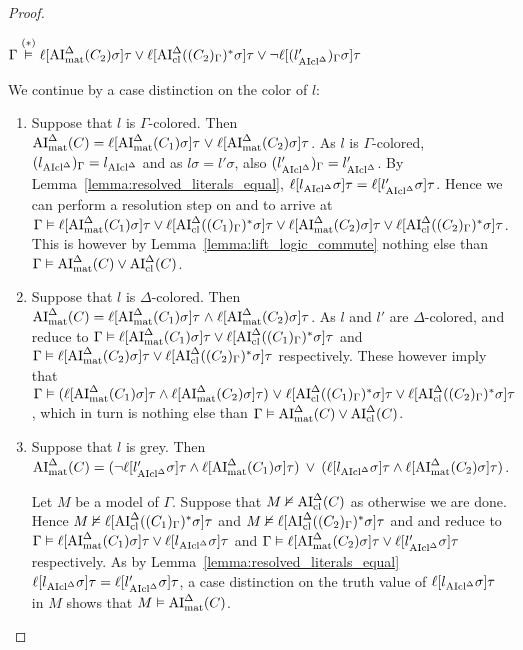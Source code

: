 \documentclass[,%
	draft=false,%
	numbers=noendperiod
	11pt,
	a4paper,
	oneside,%
	openany,
]{memoir}
\begin{document}
\begin{proof}
\begin{description}
			$\Gamma \stackrel{(*)}{\vDash} \ell[\operatorname{AI}_\mathrm{mat}^\Delta(C_2)\sigma]\tau \lor \ell[\operatorname{AI}_\mathrm{cl}^\Delta((C_2)_\Gamma)^*\sigma]\tau \lor \lnot \ell[(l{_{\operatorname{AIcl}^\Delta}'})_\Gamma\sigma]\tau$

			We continue by a case distinction on the color of $l$:
			\begin{enumerate}
				\item Suppose that $l$ is $\Gamma$-colored. Then $\operatorname{AI}_\mathrm{mat}^\Delta(C) = \ell[\operatorname{AI}_\mathrm{mat}^\Delta(C_1)\sigma]\tau\;{\lor}\; \ell[\operatorname{AI}_\mathrm{mat}^\Delta(C_2)\sigma]\tau$.
					As $l$ is $\Gamma$-colored, $(l{_{\operatorname{AIcl}^\Delta}})_\Gamma = l_{\operatorname{AIcl}^\Delta}$ and
					as $l\sigma = l'\sigma$, also $(l{_{\operatorname{AIcl}^\Delta}'})_\Gamma = l'_{\operatorname{AIcl}^\Delta}$.
					By Lemma~\ref{lemma:resolved_literals_equal}, $\ell[l{_{\operatorname{AIcl}^\Delta}}\sigma]\tau = \ell[l{_{\operatorname{AIcl}^\Delta}'}\sigma]\tau$.
					Hence we can perform a resolution step on \markA{} and \markB{} to arrive at
					$\Gamma \vDash \ell[\operatorname{AI}_\mathrm{mat}^\Delta(C_1)\sigma]\tau \lor \ell[\operatorname{AI}_\mathrm{cl}^\Delta((C_1)_\Gamma)^*\sigma]\tau
					\lor \ell[\operatorname{AI}_\mathrm{mat}^\Delta(C_2)\sigma]\tau \lor \ell[\operatorname{AI}_\mathrm{cl}^\Delta((C_2)_\Gamma)^*\sigma]\tau$.
					This is however by Lemma~\ref{lemma:lift_logic_commute} nothing else than $\Gamma \vDash \operatorname{AI}_\mathrm{mat}^\Delta(C) \lor \operatorname{AI}_\mathrm{cl}^\Delta(C)$.

				\item Suppose that $l$ is $\Delta$-colored. Then $\operatorname{AI}_\mathrm{mat}^\Delta(C) = \ell[\operatorname{AI}_\mathrm{mat}^\Delta(C_1)\sigma]\tau\;{\land}\; \ell[\operatorname{AI}_\mathrm{mat}^\Delta(C_2)\sigma]\tau$.
					As $l$ and $l'$ are $\Delta$-colored, \markA{} and \markB{} reduce to
					$\Gamma \vDash \ell[\operatorname{AI}_\mathrm{mat}^\Delta(C_1)\sigma]\tau \lor \ell[\operatorname{AI}_\mathrm{cl}^\Delta((C_1)_\Gamma)^*\sigma]\tau $ and
					$\Gamma \vDash \ell[\operatorname{AI}_\mathrm{mat}^\Delta(C_2)\sigma]\tau \lor \ell[\operatorname{AI}_\mathrm{cl}^\Delta((C_2)_\Gamma)^*\sigma]\tau $ respectively.
					These however imply that
					$\Gamma \vDash (\ell[\operatorname{AI}_\mathrm{mat}^\Delta(C_1)\sigma]\tau \land  \ell[\operatorname{AI}_\mathrm{mat}^\Delta(C_2)\sigma]\tau) \;{\lor}\;\allowbreak \ell[\operatorname{AI}_\mathrm{cl}^\Delta((C_1)_\Gamma)^*\sigma]\tau \lor \ell[\operatorname{AI}_\mathrm{cl}^\Delta((C_2)_\Gamma)^*\sigma]\tau$,
					which in turn is nothing else than $\Gamma \entails\nolinebreak \AImatde(C) \lor \AIclde(C)$.

				\item Suppose that $l$ is grey. Then $\operatorname{AI}_\mathrm{mat}^\Delta(C) =
					(\lnot {\ell[l'\ensuremath{_{\operatorname{AIcl}^\Delta}}\sigma]}\tau \land \ell[\operatorname{AI}_\mathrm{mat}^\Delta(C_1)\sigma]\tau) \;\,{\lor}\;\,\allowbreak
					(\ell[l_{\operatorname{AIcl}^\Delta}\sigma]\tau \land \ell[\operatorname{AI}_\mathrm{mat}^\Delta(C_2)\sigma]\tau)
					$.

					Let $M$ be a model of $\Gamma$. Suppose that $M \nvDash \operatorname{AI}_\mathrm{cl}^\Delta(C)$ as otherwise we are done. Hence $M \nvDash \ell[\operatorname{AI}_\mathrm{cl}^\Delta((C_1)_\Gamma)^*\sigma]\tau$ and $M \nvDash \ell[\operatorname{AI}_\mathrm{cl}^\Delta((C_2)_\Gamma)^*\sigma]\tau$ and \markA{} and \markB{} reduce to
					$\Gamma \vDash \ell[\operatorname{AI}_\mathrm{mat}^\Delta(C_1)\sigma]\tau \lor \ell[l{_{\operatorname{AIcl}^\Delta}}\sigma]\tau$
					and
					$\Gamma \vDash \ell[\operatorname{AI}_\mathrm{mat}^\Delta(C_2)\sigma]\tau \lor \ell[l{_{\operatorname{AIcl}^\Delta}'}\sigma]\tau$ respectively.
					As by Lemma~\ref{lemma:resolved_literals_equal} $\ell[l{_{\operatorname{AIcl}^\Delta}}\sigma]\tau = \ell[l{_{\operatorname{AIcl}^\Delta}'}\sigma]\tau$, a case distinction on the truth value of $\ell[l{_{\operatorname{AIcl}^\Delta}}\sigma]\tau$ in $M$ shows that $M\vDash \operatorname{AI}_\mathrm{mat}^\Delta(C)$.


\end{enumerate}
\end{description}
\end{proof}
\end{document}
